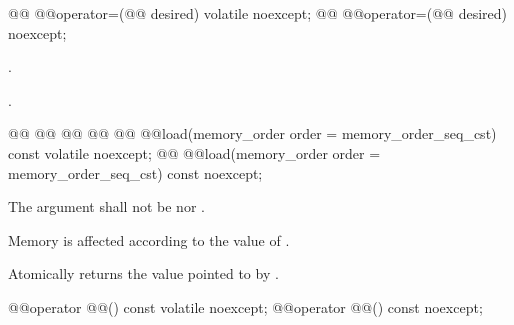 %
%
%
\begin{itemdecl}
@@ @@operator=(@@ desired) volatile noexcept;
@@ @@operator=(@@ desired) noexcept;
\end{itemdecl}

\begin{itemdescr}
\pnum
\effects {} .

\pnum
\returns {}.
\end{itemdescr}

%
%
%
%
%
\begin{itemdecl}
@@
@@
@@
@@
@@ @@load(memory_order order = memory_order_seq_cst) const volatile noexcept;
@@ @@load(memory_order order = memory_order_seq_cst) const noexcept;
\end{itemdecl}

\begin{itemdescr}
\pnum
\requires The  argument shall not be  nor .

\pnum
\effects Memory is affected according to the value of .

\pnum
\returns Atomically returns the value pointed to  by .
\end{itemdescr}

%
%
%
\begin{itemdecl}
@@operator @@() const volatile noexcept;
@@operator @@() const noexcept;
\end{itemdecl}

